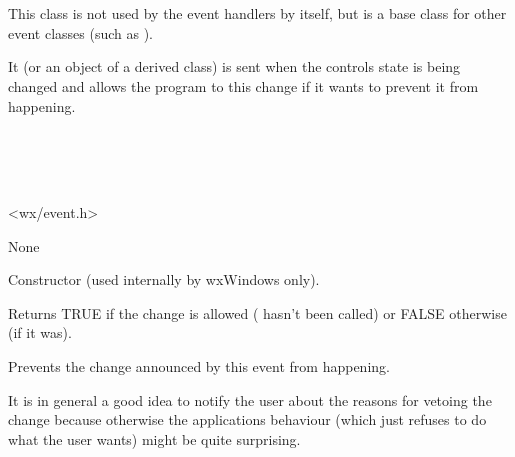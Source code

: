\section{}\label{wxnotifyevent}

This class is not used by the event handlers by itself, but is a base class
for other event classes (such as ).

It (or an object of a derived class) is sent when the controls state is being
changed and allows the program to  this
change if it wants to prevent it from happening.


\\
\\
\\


<wx/event.h>


None




\label{wxnotifyeventconstr}


Constructor (used internally by wxWindows only).

\label{wxnotifyeventisallowed}


Returns TRUE if the change is allowed ( 
hasn't been called) or FALSE otherwise (if it was).

\label{wxnotifyeventveto}


Prevents the change announced by this event from happening.

It is in general a good idea to notify the user about the reasons for vetoing
the change because otherwise the applications behaviour (which just refuses to
do what the user wants) might be quite surprising.
